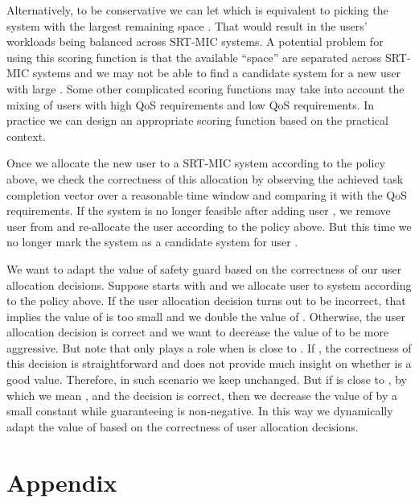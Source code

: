 \documentclass[prodmode,acmtompecs]{acmsmall}
\newcommand{\myComments}[1]{}
\newcommand{\commentEnd}{\myComments{End}}
\begin{document}
Alternatively, to be conservative we can let  which is equivalent to picking the system  with the largest remaining space . That would result in the users' workloads being balanced across SRT-MIC systems. A potential problem for using this scoring function is that the available ``space'' are separated across SRT-MIC systems and we may not be able to find a candidate system for a new user with large . Some other complicated scoring functions may take into account the mixing of users with high QoS requirements and low QoS requirements. In practice we can design an appropriate scoring function based on the practical context. 

Once we allocate the new user  to a SRT-MIC system  according to the policy above, we check the correctness of this allocation by observing the achieved task completion vector over a reasonable time window and comparing it with the QoS requirements. If the system  is no longer feasible after adding user , we remove user  from  and re-allocate the user according to the policy above. But this time we no longer mark the system  as a candidate system for user . 

We want to adapt the value of safety guard  based on the correctness of our user allocation decisions. Suppose  starts with  and we allocate user  to system  according to the policy above. If the user allocation decision turns out to be incorrect, that implies the value of  is too small and we double the value of . Otherwise, the user allocation decision is correct and we want to decrease the value of  to be more aggressive. But note that  only plays a role when  is close to . If , the correctness of this decision is straightforward and does not provide much insight on whether  is a good value. Therefore, in such scenario we keep  unchanged. But if  is close to , by which we mean , and the decision is correct, then we decrease the value of  by a small constant  while guaranteeing  is non-negative. In this way we dynamically adapt the value of  based on the correctness of user allocation decisions. 

\commentEnd\fi











\section{Appendix}
\end{document}
